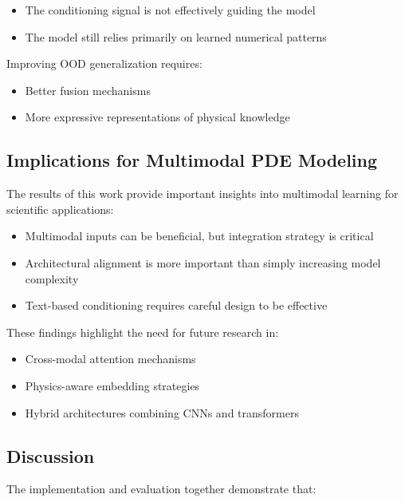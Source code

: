 \documentclass[
]{article}
\providecommand{\tightlist}{%
  \setlength{\itemsep}{0pt}\setlength{\parskip}{0pt}}
\begin{document}
\begin{itemize}
\tightlist
\item
  The conditioning signal is not effectively guiding the model
\item
  The model still relies primarily on learned numerical patterns
\end{itemize}

Improving OOD generalization requires:

\begin{itemize}
\tightlist
\item
  Better fusion mechanisms
\item
  More expressive representations of physical knowledge
\end{itemize}

\subsection{Implications for Multimodal PDE
Modeling}\label{implications-for-multimodal-pde-modeling}

The results of this work provide important insights into multimodal
learning for scientific applications:

\begin{itemize}
\tightlist
\item
  Multimodal inputs can be beneficial, but integration strategy is
  critical
\item
  Architectural alignment is more important than simply increasing model
  complexity
\item
  Text-based conditioning requires careful design to be effective
\end{itemize}

These findings highlight the need for future research in:

\begin{itemize}
\tightlist
\item
  Cross-modal attention mechanisms
\item
  Physics-aware embedding strategies
\item
  Hybrid architectures combining CNNs and transformers
\end{itemize}

\subsection{Discussion}\label{discussion}

The implementation and evaluation together demonstrate that:
\end{document}
